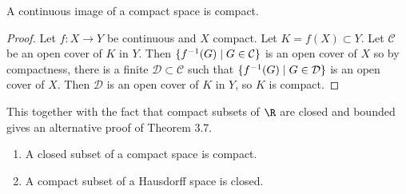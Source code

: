 \begin{theorem}              %
A continuous image of a compact space is compact.
\end{theorem}

\begin{proof}                         %
Let $f: X\rightarrow Y$ be continuous and $X$ compact. Let $K=f(X)\subset Y$. Let $\mathcal{C}$ be an open cover of $K$ in $Y$. Then $\{f^{-1} (G)\mid G\in \mathcal{C}\}$ is an open cover of $X$ so by compactness, there is a finite $\mathcal{D}\subset\mathcal{C}$ such that $\{f^{-1} (G)\mid G\in \mathcal{D}\}$ is an open cover of $X$. Then $\mathcal{D}$ is an open cover of $K$ in $Y$, so $K$ is compact.
\end{proof}

\begin{remark}
This together with the fact that compact subsets of $\R$ are closed and bounded gives an alternative proof of Theorem 3.7.
\end{remark}

\begin{lemma}         %
    \leavevmode\vspace{-1.4em}
    \begin{enumerate}
        \item A closed subset of a compact space is compact.
        \item A compact subset of a Hausdorff space is closed.
    \end{enumerate}
\end{lemma}  

